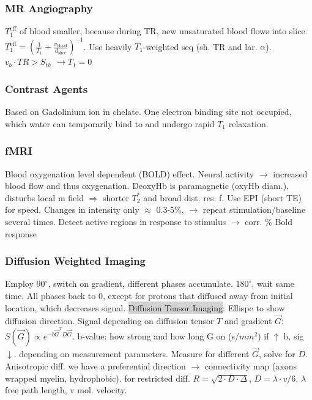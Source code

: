 \documentclass[9pt]{article}
\newcommand{\grey}[1]{\setlength{\fboxsep}{0pt}\colorbox{lightgrey}{#1}}
\begin{document}
\begin{multicols}{2}
\subsubsection{MR Angiography} 
$T_1^\mathrm{eff}$ of blood smaller, because during TR, new unsaturated blood flows into slice. $T_1^\mathrm{eff} = (\frac{1}{T_1} + \frac{v_\mathrm{blood}}{d_\mathrm{slice}})^{-1}$. Use heavily $T_1$-weighted seq (sh. TR and lar. $\alpha$). $v_b \cdot TR > S_{th}$ $\rightarrow T_1=0$

\subsubsection{Contrast Agents}
Based on Gadolinium ion in chelate. One electron binding site not occupied, which water can
temporarily bind to and undergo rapid $T_1$ relaxation.

\subsubsection{fMRI}
Blood oxygenation level dependent (BOLD) effect. Neural activity $\rightarrow$ increased blood flow and thus oxygenation. DeoxyHb is paramagnetic (oxyHb diam.), disturbs local m field $\Rightarrow$ shorter $T_2^*$ and broad dist. res. f. Use EPI (short TE) for speed. Changes in intensity only $\approx$ 0.3-5\%, $\rightarrow$ repeat stimulation/baseline several times. Detect active regions in response to stimulus $\rightarrow$ corr. $\%$ Bold response

\subsubsection{Diffusion Weighted Imaging}
Employ $90^\circ$, switch on gradient, different phases accumulate. $180^\circ$, wait same time. All phases back to 0, except for protons that diffused away from initial location, which decreases signal.
\grey{Diffusion Tensor Imaging}: Ellispe to show diffusion direction. Signal depending on diffusion tensor $T$ and gradient $\vec G$: $S(\vec G) \propto e^{-b \vec G^T \underline{D} \vec G}$. b-value: how strong and how long G on (s/$mm^2$) if $\uparrow$ b, sig $\downarrow$. depending on measurement parameters. Measure for different $\vec G$, solve for $D$. Anisotropic diff. we have a preferential direction $\rightarrow$ connectivity map (axons wrapped myelin, hydrophobic). for restricted diff. $R= \sqrt{2 \cdot D \cdot \Delta}$, $D = \lambda \cdot v/6$, $\lambda$ free path length, v mol. velocity. 


\end{multicols}
\end{document}
